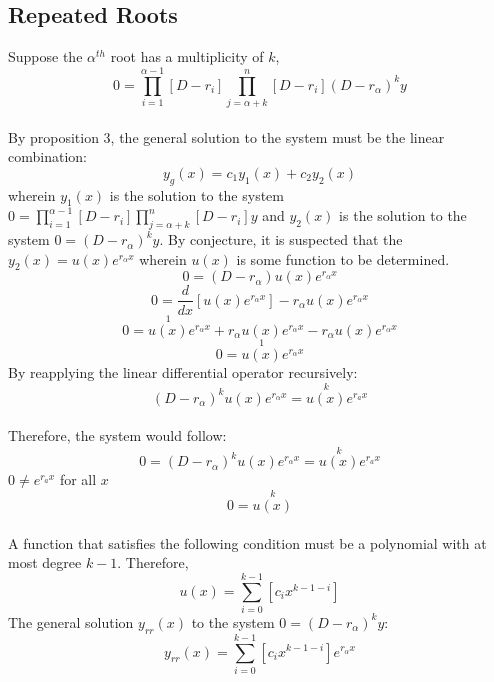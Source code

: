 \subsection{Repeated Roots}
\begin{comment}
\end{comment}
Suppose the $\alpha^{th}$ root has a multiplicity of $k$, 
$$0 = \prod_{i = 1}^{\alpha - 1}\left[D - r_i\right]\prod_{j = \alpha + k}^{n}\left[D - r_i\right](D - r_\alpha)^ky$$
\\By proposition 3, the general solution to the system must be the linear combination:
$$y_g(x) = c_1 y_1(x) + c_2 y_2(x)$$
wherein $y_1(x)$ is the solution to the system $\displaystyle{0 = \prod_{i = 1}^{\alpha - 1}\left[D - r_i\right]\prod_{j = \alpha + k}^{n}\left[D - r_i\right]y}$ and $y_2(x)$ is the solution to the system $\displaystyle{ 0 = (D - r_\alpha)^ky}$. By conjecture, it is suspected that the $\displaystyle{y_2(x) = u(x)e^{r_\alpha x}}$ wherein $u(x)$ is some function to be determined. 
$$0 = (D - r_\alpha) u(x)e^{r_\alpha x}$$
$$0 = \frac{d}{dx}\left[u(x)e^{r_\alpha x}\right] - r_\alpha u(x)e^{r_\alpha x}$$
$$0 = \overset{1}{u(x)}e^{r_\alpha x} + r_\alpha u(x)e^{r_\alpha x}  - r_\alpha u(x)e^{r_\alpha x}$$
$$0 = \overset{1}{u(x)}e^{r_\alpha x}$$
By reapplying the linear differential operator recursively:
$$(D - r_\alpha)^k u(x) e^{r_\alpha x} = \overset{k}{u(x)}e^{r_a x}$$
\\Therefore, the system would follow:
$$0 = (D - r_\alpha)^k u(x)e^{r_\alpha x} = \overset{k}{u(x)}e^{r_a x}$$
$0 \neq e^{r_a x}$ for all $x$
$$0 = \overset{k}{u(x)}$$
\\A function that satisfies the following condition must be a polynomial with at most degree $k - 1$. Therefore, 
$$u(x) = \sum_{i = 0}^{k - 1}\left[c_i x ^{k - 1 - i} \right]$$
The general solution $y_{rr}(x)$ to the system $\displaystyle{ 0 = (D - r_\alpha)^ky}$:
$$y_{rr}(x) = \sum_{i = 0}^{k - 1}\left[c_i x ^{k - 1 - i} \right] e^{r_\alpha x}$$
